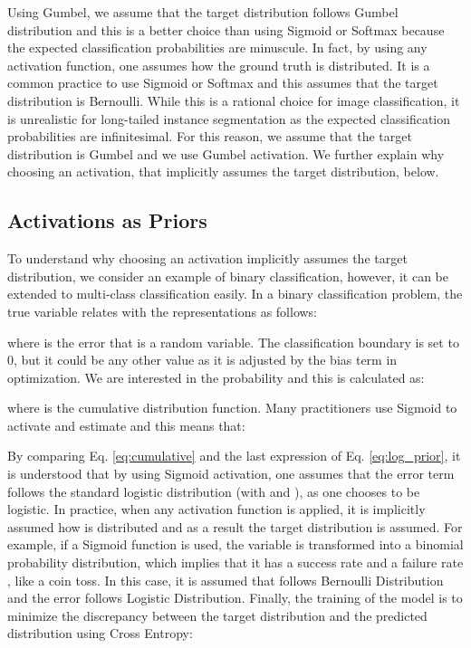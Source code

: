 \documentclass[runningheads]{llncs}
\begin{document}
Using Gumbel, we assume that the target distribution follows Gumbel distribution and this is a better choice than using Sigmoid or Softmax because the expected classification probabilities are minuscule. In fact, by using any activation function, one assumes how the ground truth is distributed. It is a common practice to use Sigmoid or Softmax and this assumes that the target distribution is Bernoulli. While this is a rational choice for image classification, it is unrealistic for long-tailed instance segmentation as the expected classification probabilities are infinitesimal. For this reason, we assume that the target distribution is Gumbel and we use Gumbel activation. We further explain why choosing an activation, that implicitly assumes the target distribution, below.

\subsection{Activations as Priors} 
\label{subsec:activ_as_prior}
To understand why choosing an activation implicitly assumes the target distribution, we consider an example of binary classification, however, it can be extended to multi-class classification easily. In a binary classification problem, the true variable  relates with the representations  as follows:

where  is the error that is a random variable. The classification boundary is set to 0, but it could be any other value as it is adjusted by the bias term  in optimization.
We are interested in the probability  and this is calculated as:

where  is the cumulative distribution function.
Many practitioners use Sigmoid to activate  and estimate  and this means that:



By comparing Eq. \ref{eq:cumulative} and the last expression of Eq. \ref{eq:log_prior}, it is understood that by using Sigmoid activation, one assumes that the error term  follows the standard logistic distribution (with  and ), as one chooses  to be logistic.
In practice, when any activation function  is applied, it is implicitly assumed how  is distributed and as a result the target distribution  is assumed. For example, if a Sigmoid function is used, the variable  is transformed into a binomial probability distribution, which implies that it has a success rate  and a failure rate , like a coin toss. In this case, it is assumed that  follows Bernoulli Distribution and the error  follows Logistic Distribution. Finally, the training of the model is to minimize the discrepancy between the target distribution  and the predicted distribution  using Cross Entropy:
\end{document}
